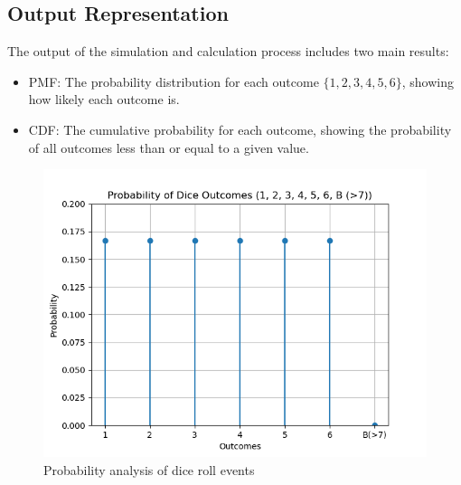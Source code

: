 \documentclass[journal]{IEEEtran}
\begin{document}
\subsection*{Output Representation}
The output of the simulation and calculation process includes two main results:
\begin{itemize}
    \item PMF: The probability distribution for each outcome \( \{1, 2, 3, 4, 5, 6\} \), showing how likely each outcome is.
    \item CDF: The cumulative probability for each outcome, showing the probability of all outcomes less than or equal to a given value.
\end{itemize}

\begin{figure}[h!]
    \centering
    \includegraphics[width=\columnwidth]{figs/fig.png}
    \caption{Probability analysis of dice roll events}
    \label{fig:event_probs}
\end{figure}
\end{document}
